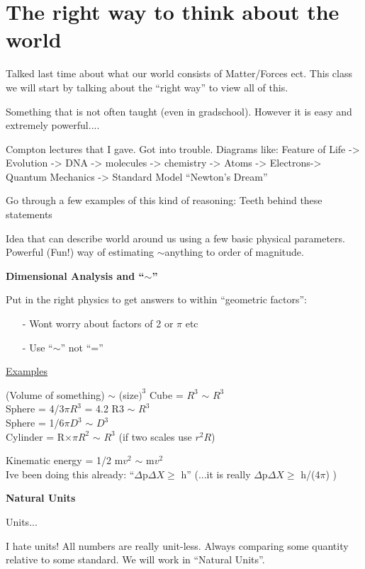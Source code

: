 {\fontsize{14}{16}\selectfont

\section{The right way to think about the world}

Talked last time about what our world consists of Matter/Forces ect.
This class we will start by talking about the ``right way'' to view all of this. 

Something that is not often taught (even in gradschool).
However it is easy and extremely powerful....

Compton lectures that I gave. 
Got into trouble. 
Diagrams like: 
Feature of Life -> Evolution -> DNA -> molecules -> chemistry  -> Atoms ->  Electrons-> Quantum Mechanics -> Standard Model
``Newton's Dream''

Go through a few examples of this kind of reasoning:
Teeth behind these statements

Idea that can describe world around us using a few basic physical parameters.
Powerful (Fun!) way of estimating $\sim$anything to order of magnitude.

\textbf{Dimensional Analysis and ``$\sim$''}

Put in the right physics to get answers to within ``geometric factors'':
\begin{itemize}
\item[-] Wont worry about factors of 2 or $\pi$ etc
\item[-] Use ``$\sim$'' not ``=''
\end{itemize}

\underline{Examples}

(Volume of something) $\sim$ (size$)^3$
Cube = $R^{3}$ $\sim$ $R^3$\\
Sphere = 4/3$\pi R^3$ = 4.2 R3 $\sim$ $R^3$\\
Sphere = 1/6$\pi D^3$  $\sim$ $D^3$\\
Cylinder = R$\times\pi R^{2}$  $\sim$ $R^3$  (if two scales use $r^2R$) 

Kinematic energy = 1/2 m$v^2$ $\sim$ m$v^2$\\
Ive been doing this already: ``$\Delta$p$\Delta X \geq $ h''
(...it is really $\Delta$p$\Delta X \geq $ h/(4$\pi$) )

\textbf{Natural Units}

Units...

I hate units! All numbers are really unit-less.
Always comparing some quantity relative to some standard. 
We will work in “Natural Units”.

}
